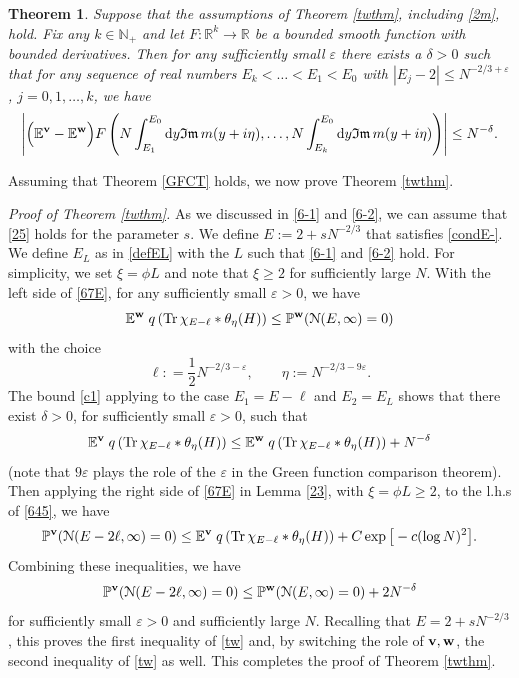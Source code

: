 \documentclass[draft]{article}
\newcommand{\e}{\varepsilon}
\newcommand{\rd}{{\rm d}}
\newcommand{\tr}{\mbox{Tr\,}}
\newcommand{\bv}{{\bf{v}}}
\newcommand{\bw}{{\bf{w}}}
\newcommand{\be}{\begin{equation}}
\newcommand{\ee}{\end{equation}}
\newcommand{\cN}{{\mathcal N}}
\newcommand{\im}{{\mathfrak{Im} \, }}
\newcommand{\E}{{\mathbb E }}
\newcommand{\R}{{\mathbb R }}
\newcommand{\N}{{\mathbb N}}
\renewcommand{\P}{{\mathbb P}}
\newtheorem{theorem}{Theorem}
\newcommand{\qed}{\hfill\fbox{}\par\vspace{0.3mm}}
\numberwithin{equation}{section}
\numberwithin{theorem}{section}
\numberwithin{definition}{section}
\numberwithin{remark}{section}
\begin{document}
\begin{theorem}  \label{GFCT2}
Suppose that  the assumptions of Theorem  \ref{twthm}, including \eqref{2m},  hold.
Fix any $k\in \N_+$ and
let  $F: \R^k \to \R $ be a bounded smooth function with bounded derivatives.
Then for any sufficiently small $\e$ there exists a $\delta>0$ such that
for any sequence of real numbers $E_k < \ldots < E_{1}< E_0 $
with $|E_j-2|\le N^{-2/3+\e}$, $j=0,1,\ldots, k$, we have
\be\label{c11}
\left| \Big ( \E^\bv- \E^\bw \Big )   F\left(N \int_{E_1}^{E_0} \rd y  \im m (y +i\eta),  
 \ldots, N \int_{E_k}^{E_0} \rd y  \im m (y+i\eta ) 
\right) \right|\leq N^{-\delta}.
\ee


\end{theorem}

\bigskip 


Assuming that  Theorem \ref{GFCT} holds, we now prove Theorem \ref{twthm}. 

\medskip 

\noindent 
{\it Proof of Theorem \ref{twthm}.}
As we discussed in \eqref{6-1} and \eqref{6-2}, we can assume that \eqref{25} holds
for the parameter $s$.
We define $E:=2+sN^{-2/3}$ that satisfies \eqref{condE-}.
We define $E_L$ as in \eqref{defEL} with the  $L$ such that \eqref{6-1} 
and \eqref{6-2} hold.  For simplicity, we set $\xi = \phi L$ and note that $\xi\ge 2$
for sufficiently large $N$. 
 With the left side of \eqref{67E}, for any sufficiently small $\e>0$, we have 
\be
\E^\bw\;  q \left(\tr \chi_{E-\ell}  \ast \theta_\eta  (H) \right)
\le \P^\bw (\cN(E, \infty)  = 0 )
\ee
with the choice 
$$
   \ell: = \frac{1}{2}N^{-2/3-\e}, \qquad \eta:= N^{-2/3-9\e}.
$$
The bound \eqref{c1}
applying to the case $E_1=E-\ell$ and 
$E_2=E_L$
shows that  there exist $\delta>0$, for sufficiently small $\e>0$, such that
\be\label{645}
\E^\bv\;  q \left(\tr \chi_{E-\ell}  \ast \theta_\eta  (H) \right)\leq 
\E^\bw\;  q \left(\tr \chi_{E-\ell}  \ast \theta_\eta  (H) \right)+N^{-\delta}
\ee
(note that $9\e$  plays the role of the $\e$ in the Green function comparison theorem).
Then applying the right side of \eqref{67E} in Lemma \ref{23}, with $\xi=\phi L\ge 2$,
 to the l.h.s of \eqref{645}, we have
\be
\P^\bv (\cN(E-2\ell, \infty)  = 0 ) \leq 
\E^\bv\;  q \left(\tr \chi_{E-\ell}  \ast \theta_\eta  (H) \right)+C\exp{\big[-c(\log N)^2\big]}.
\ee
 Combining these inequalities, we have
\be\label{Pbv}
\P^\bv (\cN(E- 2\ell, \infty)  = 0 ) \leq\P^\bw (\cN(E, \infty)  = 0 )+2N^{-\delta}
\ee
for sufficiently small $\e>0$ and  sufficiently large $N$. Recalling that 
$E=2+sN^{-2/3}$, 
this proves the first 
inequality  of \eqref{tw} and, 
by switching the role of  $\bv, \bw$, the second inequality of \eqref{tw} as well. 
 This completes the proof of Theorem \ref{twthm}.
\qed
\end{document}
